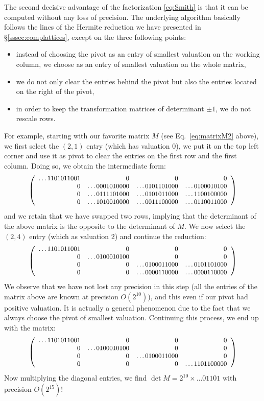 \documentclass[11pt]{article}
\numberwithin{equation}{section}
\numberwithin{figure}{section}
\theoremstyle{definition}
\begin{document}
The second decisive advantage of the factorization \eqref{eq:Smith} is 
that it can be computed without any loss of precision.
The underlying algorithm basically follows the lines of the Hermite
reduction we have presented in \S \ref{sssec:complattices}, except on
the three following points:
\begin{itemize}
\renewcommand{\itemsep}{0pt}
\item instead of choosing the pivot as an entry of smallest valuation 
on the working column, we choose as an entry of smallest valuation on
the whole matrix,
\item we do not only clear the entries behind the pivot but also the
entries located on the right of the pivot,
\item in order to keep the transformation matrices of determinant
$\pm 1$, we do not rescale rows.
\end{itemize}
For example, starting with our favorite matrix $M$ (see 
Eq.~\eqref{eq:matrixM2} above), we first select the $(2,1)$ entry
(which has valuation $0$), we put it on the top left corner and use
it as pivot to clear the entries on the first row and the first
column. Doing so, we obtain the intermediate form:
$$\small \left(\begin{array}{rrrr}
\ldots1101011001 & 0 & 0 & 0 \\
0 & \ldots0001010000 & \ldots0101101000 & \ldots0100010100 \\
0 & \ldots0111101000 & \ldots0101011000 & \ldots1100100000 \\
0 & \ldots1010010000 & \ldots0011100000 & \ldots0110011000
\end{array}\right)$$
and we retain that we have swapped two rows, implying that the
determinant of the above matrix is the opposite to the determinant
of $M$. We now select the $(2,4)$ entry (which as valuation $2$) 
and continue the reduction:
$$\small \left(\begin{array}{rrrr}
\ldots1101011001 & 0 & 0 & 0 \\
0 & \ldots0100010100 & 0 & 0 \\
0 & 0 & \ldots0100011000 & \ldots0101101000 \\
0 & 0 & \ldots0000110000 & \ldots0000110000
\end{array}\right)$$
We observe that we have not lost any precision in this step (all 
the entries of the matrix above are known at precision $O(2^{10})$),
and this 
even if our pivot had positive valuation. It is actually a general
phenomenon due to the fact that we always choose the pivot of
smallest valuation. Continuing this process, we end up with the
matrix:
$$\small \left(\begin{array}{rrrr}
\ldots1101011001 & 0 & 0 & 0 \\
0 & \ldots0100010100 & 0 & 0 \\
0 & 0 & \ldots0100011000 & 0 \\
0 & 0 & 0 & \ldots1101100000
\end{array}\right)$$
Now multiplying the diagonal entries, we find
$\det M = 2^{10} \times ...01101$ with precision $O(2^{15})$!
\end{document}
